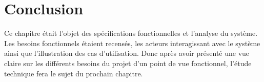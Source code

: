\section*{Conclusion}
Ce chapitre était l’objet des spécifications fonctionnelles et l’analyse du système. Les besoins
fonctionnels étaient recensés, les acteurs interagissant avec le système ainsi que l’illustration des cas
d’utilisation. Donc après avoir présenté une vue claire sur les différents besoins du projet
d’un point de vue fonctionnel, l’étude technique fera le sujet du prochain chapitre.